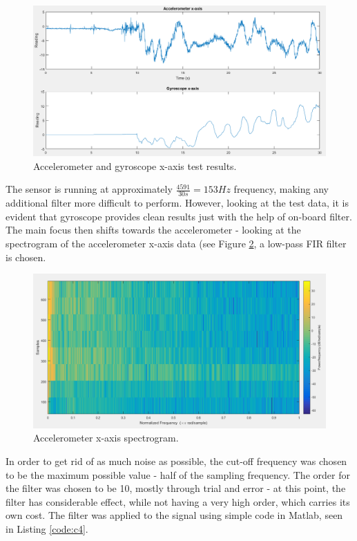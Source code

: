 \begin{figure}[H]
  \centering
    \includegraphics[width=1\textwidth]{images/MPUXPlot.png}
	\caption{Accelerometer and gyroscope x-axis test results.}
	\label{dataPlot}
\end{figure}

The sensor is running at approximately $\frac{4591}{30s} = 153Hz$ frequency, making any additional filter more difficult to perform. However, looking at the test data, it is evident that gyroscope provides clean results just with the help of on-board filter. The main focus then shifts towards the accelerometer - looking at the spectrogram of the accelerometer x-axis data (see Figure \ref{spectrogram}, a low-pass FIR filter is chosen.

\begin{figure}[H]
  \centering
    \includegraphics[width=1\textwidth]{images/spectrogram.png}
	\caption{Accelerometer x-axis spectrogram.}
	\label{spectrogram}
\end{figure}

In order to get rid of as much noise as possible, the cut-off frequency was chosen to be the maximum possible value - half of the sampling frequency. The order for the filter was chosen to be 10, mostly through trial and error - at this point, the filter has considerable effect, while not having a very high order, which carries its own cost. The filter was applied to the signal using simple code in Matlab, seen in Listing \ref{code:c4}.

